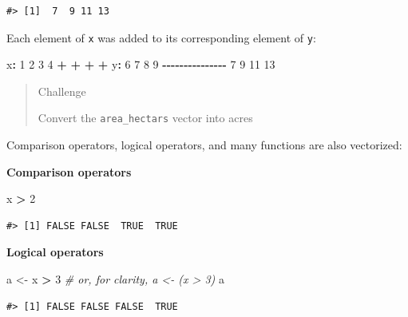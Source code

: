 \documentclass[
]{book}
\newenvironment{Shaded}{\begin{snugshade}}{\end{snugshade}}
\newcommand{\CommentTok}[1]{\textcolor[rgb]{0.56,0.35,0.01}{\textit{#1}}}
\newcommand{\DecValTok}[1]{\textcolor[rgb]{0.00,0.00,0.81}{#1}}
\newcommand{\NormalTok}[1]{#1}
\newcommand{\OtherTok}[1]{\textcolor[rgb]{0.56,0.35,0.01}{#1}}
\newcommand{\SpecialCharTok}[1]{\textcolor[rgb]{0.81,0.36,0.00}{\textbf{#1}}}
\begin{document}
\begin{verbatim}
#> [1]  7  9 11 13
\end{verbatim}

Each element of \texttt{x} was added to its corresponding element of \texttt{y}:

\begin{Shaded}
\begin{Highlighting}[]
\NormalTok{x}\SpecialCharTok{:}  \DecValTok{1}  \DecValTok{2}  \DecValTok{3}  \DecValTok{4}
    \SpecialCharTok{+}  \SpecialCharTok{+}  \SpecialCharTok{+}  \SpecialCharTok{+}
\NormalTok{y}\SpecialCharTok{:}  \DecValTok{6}  \DecValTok{7}  \DecValTok{8}  \DecValTok{9}
\SpecialCharTok{{-}{-}{-}{-}{-}{-}{-}{-}{-}{-}{-}{-}{-}{-}{-}}
    \DecValTok{7}  \DecValTok{9} \DecValTok{11} \DecValTok{13}
\end{Highlighting}
\end{Shaded}

\begin{quote}
Challenge

Convert the \texttt{area\_hectars} vector into acres
\end{quote}

Comparison operators, logical operators, and many functions are also
vectorized:

\textbf{Comparison operators}

\begin{Shaded}
\begin{Highlighting}[]
\NormalTok{x }\SpecialCharTok{\textgreater{}} \DecValTok{2}
\end{Highlighting}
\end{Shaded}

\begin{verbatim}
#> [1] FALSE FALSE  TRUE  TRUE
\end{verbatim}

\textbf{Logical operators}

\begin{Shaded}
\begin{Highlighting}[]
\NormalTok{a }\OtherTok{\textless{}{-}}\NormalTok{ x }\SpecialCharTok{\textgreater{}} \DecValTok{3}  \CommentTok{\# or, for clarity, a \textless{}{-} (x \textgreater{} 3)}
\NormalTok{a}
\end{Highlighting}
\end{Shaded}

\begin{verbatim}
#> [1] FALSE FALSE FALSE  TRUE
\end{verbatim}
\end{document}
